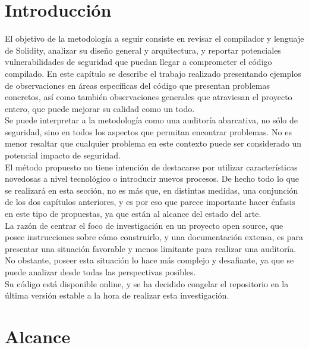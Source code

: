 

\section{Introducción}

El objetivo de la metodología a seguir consiste en revisar el compilador y lenguaje de Solidity, analizar su diseño general y arquitectura, y reportar potenciales vulnerabilidades de seguridad que puedan llegar a comprometer el código compilado. En este capítulo se describe el trabajo realizado presentando ejemplos de observaciones en áreas específicas del código que presentan problemas concretos, así como también observaciones generales que atraviesan el proyecto entero, que puede mejorar su calidad como un todo.\\

Se puede interpretar a la metodología como una auditoría abarcativa, no sólo de seguridad, sino en todos los aspectos que permitan encontrar problemas. No es menor resaltar que cualquier problema en este contexto puede ser considerado un potencial impacto de seguridad.\\

El método propuesto no tiene intención de destacarse por utilizar características novedosas a nivel tecnológico o introducir nuevos procesos. De hecho todo lo que se realizará en esta sección, no es más que, en distintas medidas, una conjunción de los dos capítulos anteriores, y es por eso que parece importante hacer énfasis en este tipo de propuestas, ya que están al alcance del estado del arte.\\

La razón de centrar el foco de investigación en un proyecto open source, que posee instrucciones sobre cómo construirlo, y una documentación extensa, es para presentar una situación favorable y menos limitante para realizar una auditoría. No obstante, poseer esta situación lo hace más complejo y desafiante, ya que se puede analizar desde todas las perspectivas posibles.\\

Su código está disponible online, y se ha decidido congelar el repositorio en la última versión estable a la hora de realizar esta investigación.

\section{Alcance}
